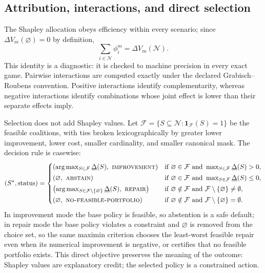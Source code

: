 \documentclass[pdflatex,sn-mathphys-num]{sn-jnl}
\theoremstyle{thmstyleone}
\theoremstyle{thmstyletwo}
\theoremstyle{thmstylethree}
\newcommand{\Players}{\mathcal{N}}
\newcommand{\Utility}{V}
\newcommand{\Shap}{\phi}
\begin{document}
\subsection{Attribution, interactions, and direct selection}

The Shapley allocation obeys efficiency within every scenario; since $\Delta\Utility_m(\varnothing)=0$ by definition,
\begin{equation}
 \sum_{i\in\Players}\Shap_i^m=\Delta\Utility_m(\Players).
\label{eq:efficiency}
\end{equation}
This identity is a diagnostic: it is checked to machine precision in every exact game. Pairwise interactions are computed exactly under the declared Grabisch--Roubens convention. Positive interactions identify complementarity, whereas negative interactions identify combinations whose joint effect is lower than their separate effects imply.

Selection does not add Shapley values. Let $\mathcal{F}=\{S\subseteq\Players:\mathbf{1}_{\mathcal F}(S)=1\}$ be the feasible coalitions, with ties broken lexicographically by greater lower improvement, lower cost, smaller cardinality, and smaller canonical mask. The decision rule is casewise:
\begin{equation}
 (S^\star,\mathrm{status})=
 \begin{cases}
 \left(\arg\max_{S\in\mathcal F}\underline\Delta(S),\ \textsc{improvement}\right) & \text{if }\varnothing\in\mathcal F\text{ and }\max_{S\in\mathcal F}\underline\Delta(S)>0,\\[2pt]
 \left(\varnothing,\ \textsc{abstain}\right) & \text{if }\varnothing\in\mathcal F\text{ and }\max_{S\in\mathcal F}\underline\Delta(S)\leq0,\\[2pt]
 \left(\arg\max_{S\in\mathcal F\setminus\{\varnothing\}}\underline\Delta(S),\ \textsc{repair}\right) & \text{if }\varnothing\notin\mathcal F\text{ and }\mathcal F\setminus\{\varnothing\}\neq\emptyset,\\[2pt]
 \left(\varnothing,\ \textsc{no-feasible-portfolio}\right) & \text{if }\varnothing\notin\mathcal F\text{ and }\mathcal F\setminus\{\varnothing\}=\emptyset.
 \end{cases}
\label{eq:improve}
\end{equation}
In improvement mode the base policy is feasible, so abstention is a safe default; in repair mode the base policy violates a constraint and $\varnothing$ is removed from the choice set, so the same maximin criterion chooses the least-worst feasible repair even when its numerical improvement is negative, or certifies that no feasible portfolio exists. This direct objective preserves the meaning of the outcome: Shapley values are explanatory credit; the selected policy is a constrained action.
\end{document}
